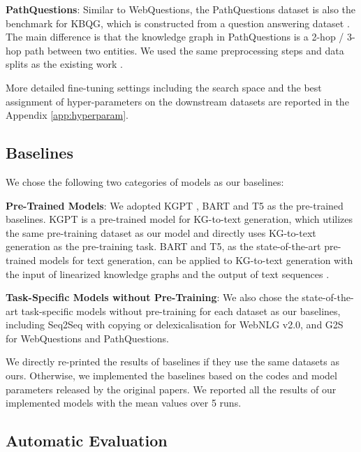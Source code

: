 \documentclass[11pt,a4paper]{article}
\begin{document}
\noindent \textbf{PathQuestions}: Similar to WebQuestions, the PathQuestions dataset is also the benchmark for KBQG, which is constructed from a question answering dataset \cite{zhou2018pathquestion}. The main difference is that the knowledge graph in PathQuestions is a 2-hop / 3-hop path between two entities. We used the same preprocessing steps and data splits as the existing work \cite{kumar2019mhqg,chen2020bignn}.



More detailed fine-tuning settings including the search space and the best assignment of hyper-parameters on the downstream datasets are reported in the Appendix \ref{app:hyperparam}.






\subsection{Baselines}

We chose the following two categories of models as our baselines:

\noindent \textbf{Pre-Trained Models}: We adopted KGPT \cite{chen2020kgpt}, BART \cite{lewis2020bart} and T5 \cite{raffel2020t5} as the pre-trained baselines. KGPT is a pre-trained model for KG-to-text generation, which utilizes the same pre-training dataset as our model and directly uses KG-to-text generation as the pre-training task. BART and T5, as the state-of-the-art pre-trained models for text generation, can be applied to KG-to-text generation with the input of linearized knowledge graphs and the output of text sequences \cite{ribeiro2020investigate}.


\noindent \textbf{Task-Specific Models without Pre-Training}: We also chose the state-of-the-art task-specific models without pre-training for each dataset as our baselines, including Seq2Seq with copying or delexicalisation \cite{shimorina2018webnlgv2} for WebNLG v2.0, and G2S \cite{chen2020bignn} for WebQuestions and PathQuestions.


We directly re-printed the results of baselines if they use the same datasets as ours. Otherwise, we implemented the baselines based on the codes and model parameters released by the original papers. We reported all the results of our implemented models with the mean values over 5 runs.


\subsection{Automatic Evaluation}
\end{document}
